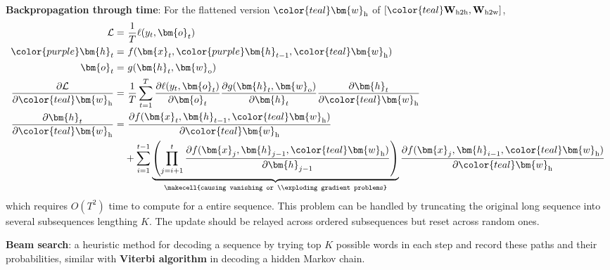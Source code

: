 \textbf{Backpropagation through time}: For the flattened version ${\color{teal}\bm{w}_\text{h}}$ of $[{\color{teal}\mathbf{W}_\text{h2h},\mathbf{W}_\text{h2w}}]$,
\begin{align}
    \mathcal{L} =&~ \frac{1}{T}\ell{(y_t,\bm{o}_t)} \\
    {\color{purple}\bm{h}_t} =&~ f(\bm{x}_t,{\color{purple}\bm{h}_{t-1}},{\color{teal}\bm{w}_\text{h}}) \\
    \bm{o}_t =&~ g(\bm{h}_t,\bm{w}_\text{o}) \\
    \frac{\partial\mathcal{L}}{\partial{\color{teal}\bm{w}_\text{h}}} 
    =&~ \frac{1}{T}\sum_{t=1}^T
        \frac{\partial\ell(y_t,\bm{o}_t)}{\partial\bm{o}_t}
        \frac{\partial g(\bm{h}_t,\bm{w}_\text{o})}{\partial\bm{h}_t}
        \frac{\partial\bm{h}_t}{\partial{\color{teal}\bm{w}_\text{h}}} \\
    \frac{\partial\bm{h}_t}{\partial{\color{teal}\bm{w}_\text{h}}}
    =&~ \frac{\partial f(\bm{x}_t,\bm{h}_{t-1},{\color{teal}\bm{w}_\text{h}})}{\partial{\color{teal}\bm{w}_\text{h}}}\\
        &+ \sum_{i=1}^{t-1}
        \underbrace{\left(
            \prod_{j=i+1}^t\frac{\partial f(\bm{x}_j,\bm{h}_{j-1},{\color{teal}\bm{w}_\text{h}})}{\partial\bm{h}_{j-1}}
        \right)}_\text{\makecell{causing vanishing or \\exploding gradient problems}}
        \frac{\partial f(\bm{x}_j,\bm{h}_{i-1},{\color{teal}\bm{w}_\text{h}})}{\partial{\color{teal}\bm{w}_\text{h}}}
\end{align}
which requires $O(T^2)$ time to compute for a entire sequence. 
This problem can be handled by truncating the original long sequence into several subsequences lengthing $K$.
The update should be relayed across ordered subsequences but reset across random ones.



\textbf{Beam search}: a heuristic method for decoding a sequence 
by trying top $K$ possible words in each step and record these paths and their probabilities, similar with \textbf{Viterbi algorithm} in decoding a hidden Markov chain.

